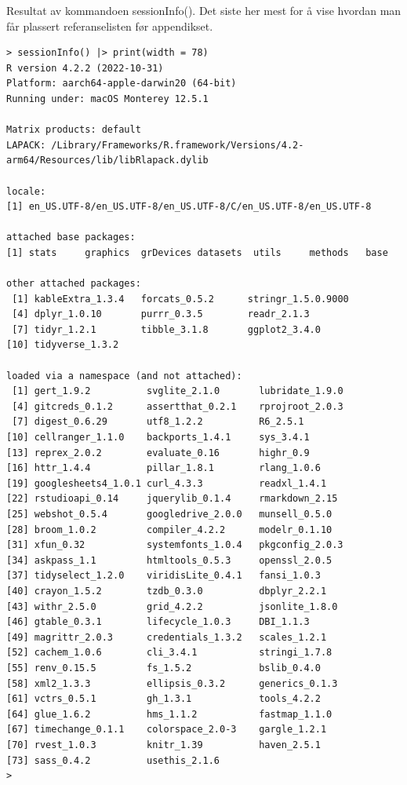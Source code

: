 \documentclass[
  letterpaper,
  DIV=11,
  numbers=noendperiod]{scrartcl}
\begin{document}
Resultat av kommandoen sessionInfo(). Det siste her mest for å vise
hvordan man får plassert referanselisten før appendikset.

\begin{verbatim}
> sessionInfo() |> print(width = 78)
R version 4.2.2 (2022-10-31)
Platform: aarch64-apple-darwin20 (64-bit)
Running under: macOS Monterey 12.5.1

Matrix products: default
LAPACK: /Library/Frameworks/R.framework/Versions/4.2-arm64/Resources/lib/libRlapack.dylib

locale:
[1] en_US.UTF-8/en_US.UTF-8/en_US.UTF-8/C/en_US.UTF-8/en_US.UTF-8

attached base packages:
[1] stats     graphics  grDevices datasets  utils     methods   base     

other attached packages:
 [1] kableExtra_1.3.4   forcats_0.5.2      stringr_1.5.0.9000
 [4] dplyr_1.0.10       purrr_0.3.5        readr_2.1.3       
 [7] tidyr_1.2.1        tibble_3.1.8       ggplot2_3.4.0     
[10] tidyverse_1.3.2   

loaded via a namespace (and not attached):
 [1] gert_1.9.2          svglite_2.1.0       lubridate_1.9.0    
 [4] gitcreds_0.1.2      assertthat_0.2.1    rprojroot_2.0.3    
 [7] digest_0.6.29       utf8_1.2.2          R6_2.5.1           
[10] cellranger_1.1.0    backports_1.4.1     sys_3.4.1          
[13] reprex_2.0.2        evaluate_0.16       highr_0.9          
[16] httr_1.4.4          pillar_1.8.1        rlang_1.0.6        
[19] googlesheets4_1.0.1 curl_4.3.3          readxl_1.4.1       
[22] rstudioapi_0.14     jquerylib_0.1.4     rmarkdown_2.15     
[25] webshot_0.5.4       googledrive_2.0.0   munsell_0.5.0      
[28] broom_1.0.2         compiler_4.2.2      modelr_0.1.10      
[31] xfun_0.32           systemfonts_1.0.4   pkgconfig_2.0.3    
[34] askpass_1.1         htmltools_0.5.3     openssl_2.0.5      
[37] tidyselect_1.2.0    viridisLite_0.4.1   fansi_1.0.3        
[40] crayon_1.5.2        tzdb_0.3.0          dbplyr_2.2.1       
[43] withr_2.5.0         grid_4.2.2          jsonlite_1.8.0     
[46] gtable_0.3.1        lifecycle_1.0.3     DBI_1.1.3          
[49] magrittr_2.0.3      credentials_1.3.2   scales_1.2.1       
[52] cachem_1.0.6        cli_3.4.1           stringi_1.7.8      
[55] renv_0.15.5         fs_1.5.2            bslib_0.4.0        
[58] xml2_1.3.3          ellipsis_0.3.2      generics_0.1.3     
[61] vctrs_0.5.1         gh_1.3.1            tools_4.2.2        
[64] glue_1.6.2          hms_1.1.2           fastmap_1.1.0      
[67] timechange_0.1.1    colorspace_2.0-3    gargle_1.2.1       
[70] rvest_1.0.3         knitr_1.39          haven_2.5.1        
[73] sass_0.4.2          usethis_2.1.6      
> 
\end{verbatim}
\end{document}
